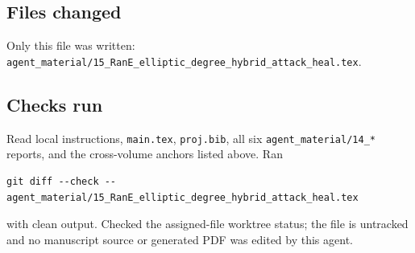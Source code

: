 \subsection{Files changed}

Only this file was written:
\verb|agent_material/15_RanE_elliptic_degree_hybrid_attack_heal.tex|.

\subsection{Checks run}

Read local instructions, \verb|main.tex|, \verb|proj.bib|, all six
\verb|agent_material/14_*| reports, and the cross-volume anchors listed
above.  Ran
\begin{verbatim}
git diff --check -- agent_material/15_RanE_elliptic_degree_hybrid_attack_heal.tex
\end{verbatim}
with clean output.  Checked the assigned-file worktree status; the file
is untracked and no manuscript source or generated PDF was edited by this
agent.
